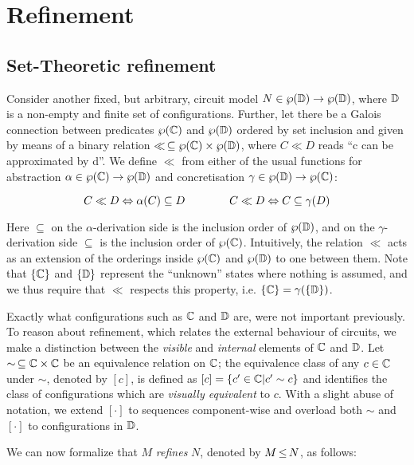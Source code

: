 \section{Refinement}

\subsection{Set-Theoretic refinement}

Consider another fixed, but arbitrary, circuit model $N \in \wp(\mathbb{D}) \rightarrow \wp(\mathbb{D})$, where $\mathbb{D}$ is a non-empty and finite set of configurations. Further, let there be a Galois connection between predicates $\wp(\mathbb{C})$ and $\wp(\mathbb{D})$ ordered by set inclusion and given by means of a binary relation $\ll \, \subseteq \wp(\mathbb{C}) \times \wp(\mathbb{D})$, where $C \ll D$ reads ``c can be approximated by d''. We define $\ll$ from either of the usual functions for abstraction $\alpha \in \wp(\mathbb{C}) \rightarrow \wp(\mathbb{D})$ and concretisation $\gamma \in \wp(\mathbb{D}) \rightarrow \wp(\mathbb{C})$:

\begin{equation*}
C \ll D \Leftrightarrow \alpha(C) \subseteq D \quad\quad\quad\quad C \ll D \Leftrightarrow C \subseteq \gamma(D)
\end{equation*}

\noindent Here $\subseteq$ on the $\alpha$-derivation side is the inclusion order of $\wp(\mathbb{D})$, and on the $\gamma$-derivation side $\subseteq$ is the inclusion order of $\wp(\mathbb{C})$. Intuitively, the relation $\ll$ acts as an extension of the orderings inside $\wp(\mathbb{C})$ and $\wp(\mathbb{D})$ to one between them. Note that $\{ \mathbb{C} \}$ and $\{ \mathbb{D} \}$ represent the ``unknown'' states where nothing is assumed, and we thus require that $\ll$ respects this property, i.e. $\{ \mathbb{C} \} = \gamma(\{ \mathbb{D} \})$.

Exactly what configurations such as $\mathbb{C}$ and $\mathbb{D}$ are, were not important previously. To reason about refinement, which relates the external behaviour of circuits, we make a distinction between the \textit{visible} and \textit{internal} elements of $\mathbb{C}$ and $\mathbb{D}$. Let $\sim \, \subseteq \mathbb{C} \times \mathbb{C}$ be an equivalence relation on $\mathbb{C}$; the equivalence class of any $c \in \mathbb{C}$ under $\sim$, denoted by $[c]$, is defined as $[c] = \{ c' \in \mathbb{C} | c' \sim c \}$ and identifies the class of configurations which are \textit{visually equivalent} to $c$. With a slight abuse of notation, we extend $[\cdot]$ to sequences component-wise and overload both $\sim$ and $[\cdot]$ to configurations in $\mathbb{D}$.

We can now formalize that $M$ \textit{refines} $N$, denoted by $M \operatorname{\leq} N$, as follows:

